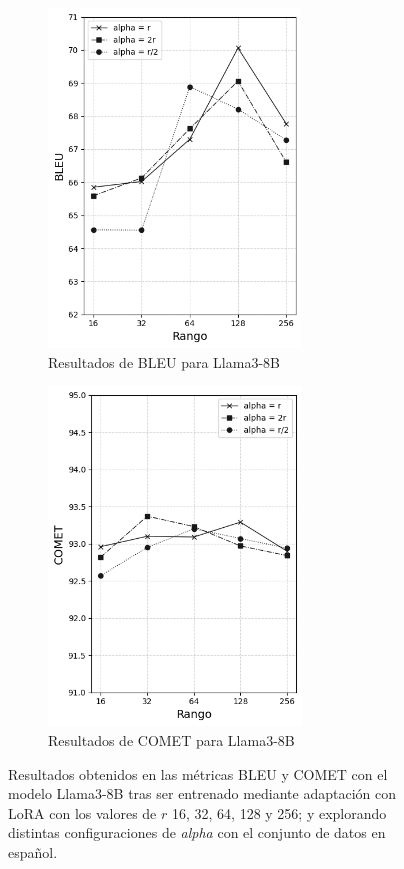 \documentclass[11pt,spanish,listoffigures,listoftables]{tfgetsinf}
\begin{document}
\begin{figure}[!h]

\begin{subfigure}{0.5\textwidth}
\includegraphics[width=0.9\linewidth, height=9cm]{images/llama_BLEU_} 
\caption{Resultados de BLEU para Llama3-8B}
\label{fig:subim1}
\end{subfigure}
\begin{subfigure}{0.5\textwidth}
\includegraphics[width=0.9\linewidth, height=9cm]{images/llama_COMET_}
\caption{Resultados de COMET para Llama3-8B}
\label{fig:subim2}
\end{subfigure}

\caption{Resultados obtenidos en las métricas BLEU y COMET con el modelo Llama3-8B tras ser entrenado mediante adaptación con LoRA con los valores de $r$ 16, 32, 64, 128 y 256;  y explorando distintas configuraciones de \textit{alpha} con el conjunto de datos en español.}
\label{fig:graficasLlama}
\end{figure}
\end{document}

